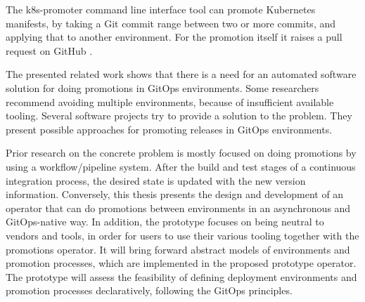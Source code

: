 The k8s-promoter command line interface tool can promote Kubernetes manifests, by
taking a Git commit range between two or more commits, and applying that to another environment.
For the promotion itself it raises a pull request on GitHub
\autocite{form3techK8sPromoter}.


The presented related work shows that there is a need for an automated software solution
for doing promotions in GitOps environments.
Some researchers recommend avoiding multiple environments,
because of insufficient available tooling.
Several software projects try to provide a solution to the problem.
They present possible approaches for promoting releases in GitOps environments.

Prior research on the concrete problem is mostly focused on
doing promotions by using a workflow/pipeline system.
After the build and test stages of a continuous integration process,
the desired state is updated with the new version information.
%
Conversely, this thesis presents the design and development
of an operator that can do promotions between environments
in an asynchronous and GitOps-native way.
In addition, the prototype focuses on being neutral to vendors
and tools, in order for users to use their various tooling
together with the promotions operator.
It will bring forward
abstract models of environments and promotion processes,
which are implemented in the proposed prototype operator.
The prototype will assess the feasibility of
defining deployment environments and promotion processes declaratively,
following the GitOps principles.






























